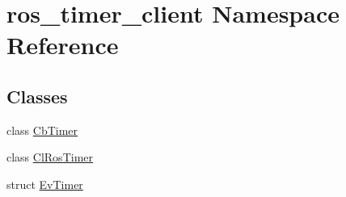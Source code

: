 \hypertarget{namespaceros__timer__client}{}\section{ros\+\_\+timer\+\_\+client Namespace Reference}
\label{namespaceros__timer__client}
\subsection*{Classes}
\begin{DoxyCompactItemize}
\item 
class \hyperlink{classros__timer__client_1_1CbTimer}{Cb\+Timer}
\item 
class \hyperlink{classros__timer__client_1_1ClRosTimer}{Cl\+Ros\+Timer}
\item 
struct \hyperlink{structros__timer__client_1_1EvTimer}{Ev\+Timer}
\end{DoxyCompactItemize}

